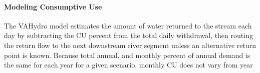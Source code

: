 
\vspace{-2mm}
\paragraph{Modeling Consumptive Use}\mbox{}\smallskip
\label{sec:cu_modeling}

\noindent The VAHydro model estimates the amount of water returned to the stream each day by subtracting the CU percent from the total daily withdrawal, then routing the return flow to the next downstream river segment unless an alternative return point is known. Because total annual, and monthly percent of annual demand is the same for each year for a given scenario, monthly CU does not vary from year 
\restoregeometry

